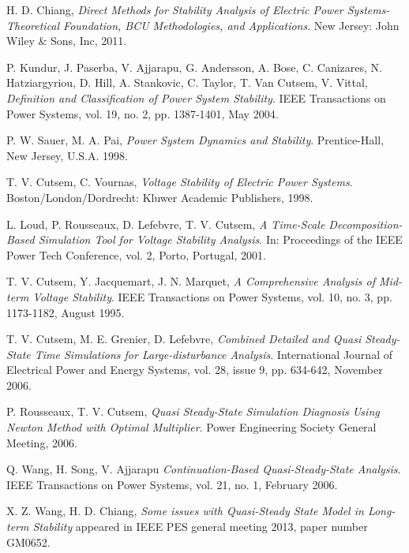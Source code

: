 \documentclass[journal]{IEEEtran}
\begin{document}
\begin{thebibliography}{1}

H. D. Chiang, {\em Direct Methods for Stability Analysis of Electric Power Systems-Theoretical Foundation, BCU Methodologies, and Applications}.
\newblock New Jersey: John Wiley \& Sons, Inc, 2011.

P. Kundur, J. Paserba, V. Ajjarapu, G. Andersson, A. Bose, C. Canizares, N. Hatziargyriou, D. Hill, A. Stankovic, C. Taylor, T. Van Cutsem, V. Vittal, {\em Definition and Classification of Power System Stability}.
\newblock IEEE Transactions on Power Systems, vol. 19, no. 2, pp. 1387-1401, May 2004.

P. W. Sauer, M. A. Pai, {\em Power System Dynamics and Stability}.
\newblock  Prentice-Hall, New Jersey, U.S.A. 1998.

T. V. Cutsem, C. Vournas, {\em Voltage Stability of Electric Power Systems}.
\newblock Boston/London/Dordrecht: Kluwer Academic Publishers, 1998.

L. Loud, P. Rousseaux, D. Lefebvre, T. V. Cutsem, {\em A Time-Scale Decomposition-Based Simulation Tool for Voltage Stability Analysis}.
\newblock In: Proceedings of the IEEE Power Tech Conference, vol. 2, Porto, Portugal, 2001.

T. V. Cutsem, Y. Jacquemart, J. N. Marquet, {\em A Comprehensive Analysis of Mid-term Voltage Stability}.
\newblock IEEE Transactions on Power Systems, vol. 10, no. 3, pp. 1173-1182, August 1995.

T. V. Cutsem, M. E. Grenier, D. Lefebvre, {\em Combined Detailed and Quasi Steady-State Time Simulations for Large-disturbance Analysis}.
\newblock International Journal of Electrical Power and Energy Systems, vol. 28, issue 9, pp. 634-642, November 2006.

P. Rousseaux, T. V. Cutsem, {\em Quasi Steady-State Simulation Diagnosis Using Newton Method with Optimal Multiplier}.
\newblock Power Engineering Society General Meeting, 2006.

Q. Wang, H. Song, V. Ajjarapu {\em Continuation-Based Quasi-Steady-State Analysis}.
\newblock IEEE Transactions on Power Systems, vol. 21, no. 1, February 2006.

X. Z. Wang, H. D. Chiang, {\em Some issues with Quasi-Steady State Model in Long-term Stability}
\newblock appeared in IEEE PES general meeting 2013, paper number GM0652.


\end{thebibliography}
\end{document}
